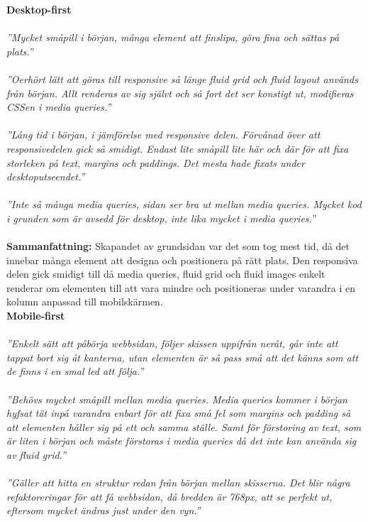 \documentclass[11pt]{article}
\begin{document}
\textbf{Desktop-first}
\\\\
\textit{”Mycket småpill i början, många element att finslipa, göra fina och sättas på plats.”}\\\\
\textit{”Oerhört lätt att göras till responsive så länge fluid grid och fluid layout används från början. Allt renderas av sig självt och så fort det ser konstigt ut, modifieras CSSen i media queries.”}\\\\
\textit{”Lång tid i början, i jämförelse med responsive delen. Förvånad över att responsivedelen gick så smidigt. Endast lite småpill lite här och där för att fixa storleken på text, margins och paddings. Det mesta hade fixats under desktoputseendet.”}\\\\
\textit{”Inte så många media queries, sidan ser bra ut mellan media queries. Mycket kod i grunden som är avsedd för desktop, inte lika mycket i media queries.”}\\\\
\textbf{Sammanfattning:} Skapandet av grundsidan var det som tog mest tid, då det innebar många element att designa och positionera på rätt plats. Den responsiva delen gick smidigt till då media queries, fluid grid och fluid images enkelt renderar om elementen till att vara mindre och positioneras under varandra i en kolumn anpassad till mobilskärmen.
\vspace{0.735cm}
\\
\textbf{Mobile-first}
\\\\
\textit{”Enkelt sätt att påbörja webbsidan, följer skissen uppifrån neråt, går inte att tappat bort sig åt kanterna, utan elementen är så pass små att det känns som att de finns i en smal led att följa.”}\\\\
\textit{”Behövs mycket småpill mellan media queries. Media queries kommer i början hyfsat tät inpå varandra enbart för att fixa små fel som margins och padding så att elementen håller sig på ett och samma ställe. Samt för förstoring av text, som är liten i början och måste förstoras i media queries då det inte kan använda sig av fluid grid.”}\\\\
\textit{”Gäller att hitta en struktur redan från början mellan skisserna. Det blir några refaktoreringar för att få webbsidan, då bredden är 768px, att se perfekt ut, eftersom mycket ändras just under den vyn.”}\\\\
\end{document}
